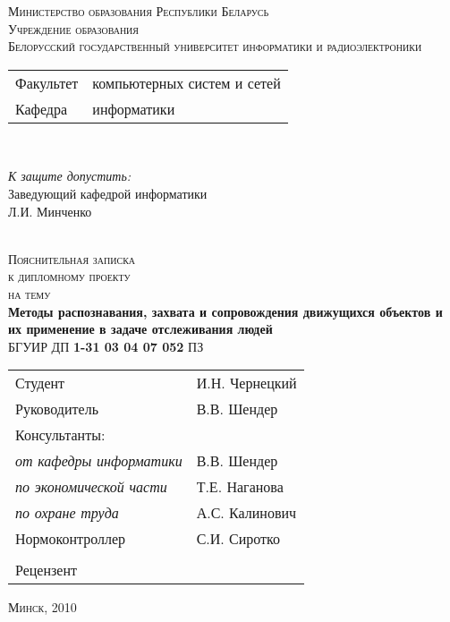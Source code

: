 \begin{titlepage}
  \begin{center}
    \textsc{\small Министерство образования Республики Беларусь}\\[0.5cm]
    \textsc{\small Учреждение образования\\\large Белорусский государственный университет информатики и радиоэлектроники}\\[0.5cm]
    \begin{minipage}{\textwidth}
      \begin{flushleft}
        \begin{tabular}{ l l }
          Факультет & компьютерных систем и сетей\\
          Кафедра   & информатики
        \end{tabular}
      \end{flushleft}
    \end{minipage}\\[0.5cm]
    \begin{minipage}{\textwidth}
      \begin{flushright}
        \textit{К защите допустить:}\\
        Заведующий кафедрой информатики\\
        \underline{\hspace*{4.5cm}} Л.И. Минченко
      \end{flushright}
    \end{minipage}\\[1.5cm]
    \textsc{\large Пояснительная записка}\\
    \textsc{\small к дипломному проекту}\\
    \textsc{\small на тему}\\[0.5cm]
    \textbf{\large Методы распознавания, захвата и сопровождения движущихся объектов и их применение в задаче отслеживания людей}\\[0.5cm]
    {\small БГУИР ДП \textbf{1-31 03 04 07 052} ПЗ}\\[0.5cm]
    {\small
      \begin{tabular}{ l l }
        Студент \hspace*{10cm} & И.Н. Чернецкий\\
        Руководитель & В.В. Шендер\\
        Консультанты: &\\
        \hspace*{0.5cm}\emph{от кафедры информатики} & В.В. Шендер\\
        \hspace*{0.5cm}\emph{по экономической части} & Т.Е. Наганова\\
        \hspace*{0.5cm}\emph{по охране труда} & А.С. Калинович\\
        Нормоконтроллер & С.И. Сиротко\\
        &\\
        Рецензент &
      \end{tabular}
    }
    \vfill
    \textsc{\small Минск, 2010}
  \end{center}
\end{titlepage}
